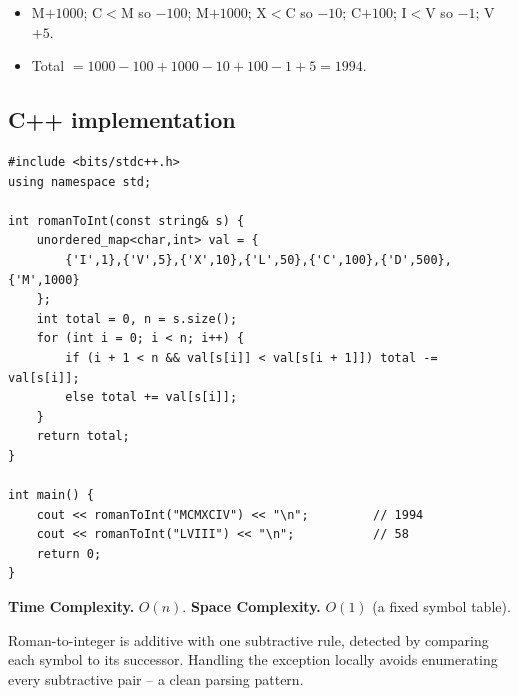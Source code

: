
\begin{itemize}
  \item M$+1000$; C$<$M so $-100$; M$+1000$; X$<$C so $-10$; C$+100$;
        I$<$V so $-1$; V$+5$.
  \item Total $=1000-100+1000-10+100-1+5=1994$.
\end{itemize}

\subsection*{C++ implementation}

\begin{lstlisting}
#include <bits/stdc++.h>
using namespace std;

int romanToInt(const string& s) {
    unordered_map<char,int> val = {
        {'I',1},{'V',5},{'X',10},{'L',50},{'C',100},{'D',500},{'M',1000}
    };
    int total = 0, n = s.size();
    for (int i = 0; i < n; i++) {
        if (i + 1 < n && val[s[i]] < val[s[i + 1]]) total -= val[s[i]];
        else total += val[s[i]];
    }
    return total;
}

int main() {
    cout << romanToInt("MCMXCIV") << "\n";         // 1994
    cout << romanToInt("LVIII") << "\n";           // 58
    return 0;
}
\end{lstlisting}

\begin{complexitybox}
\textbf{Time Complexity.} $O(n)$. \textbf{Space Complexity.} $O(1)$ (a
fixed symbol table).
\end{complexitybox}

\begin{takeawaybox}
Roman-to-integer is additive with one subtractive rule, detected by
comparing each symbol to its successor. Handling the exception locally
avoids enumerating every subtractive pair -- a clean parsing pattern.
\end{takeawaybox}
